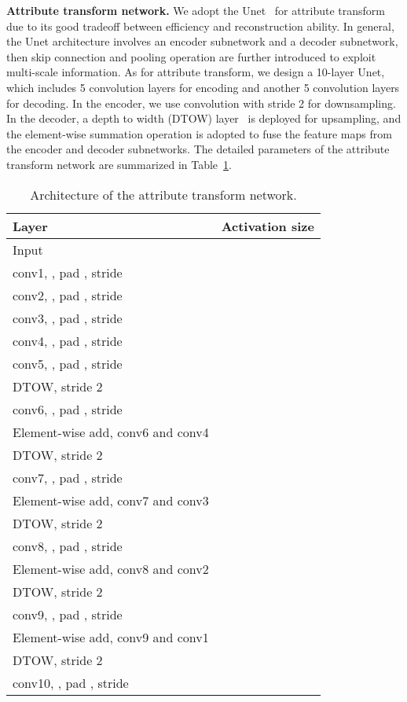 \documentclass[journal]{IEEEtran}
\begin{document}
\textbf{Attribute transform network.}
We adopt the Unet~\cite{ronneberger2015u} for attribute transform due to its good tradeoff between efficiency and reconstruction ability.
In general, the Unet architecture involves an encoder subnetwork and a decoder subnetwork, then skip connection and pooling operation are further introduced to exploit multi-scale information.
As for attribute transform, we design a 10-layer Unet, which includes 5 convolution layers for encoding and another 5 convolution layers for decoding.
In the encoder, we use convolution with stride 2 for downsampling.
In the decoder, a depth to width (DTOW) layer~\cite{shi2016real} is deployed for upsampling, and the element-wise summation operation is adopted to fuse the feature maps from the encoder and decoder subnetworks.
The detailed parameters of the attribute transform network are summarized in Table~\ref{table:transfer}.



\begin{table}[htb]
\caption{Architecture of the attribute transform network.}
\footnotesize
\begin{center}
\begin{tabular}{l|c}
\hline
Layer&  Activation size  \\
\hline
Input&  \\
conv1, , pad , stride  &  \\
conv2, , pad , stride  &  \\
conv3, , pad , stride  &  \\
conv4, , pad , stride  &  \\
conv5, , pad , stride  &  \\
DTOW, stride 2 & \\
conv6, , pad , stride  &  \\
Element-wise add, conv6 and conv4 & \\
DTOW, stride 2 & \\
conv7, , pad , stride  &  \\
Element-wise add, conv7 and conv3 & \\
DTOW, stride 2 & \\
conv8, , pad , stride  &  \\
Element-wise add, conv8 and conv2 & \\
DTOW, stride 2 & \\
conv9, , pad , stride  &  \\
Element-wise add, conv9 and conv1 & \\
DTOW, stride 2 & \\
conv10, , pad , stride  &
\\
\hline
\end{tabular}
\end{center}
\label{table:transfer}
\end{table}
\end{document}
